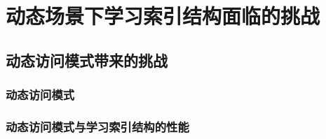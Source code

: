 \chapter{动态场景下学习索引结构面临的挑战}
\label{chap:challenge}

\section{动态访问模式带来的挑战}

\subsection{动态访问模式}

\subsection{动态访问模式与学习索引结构的性能}



